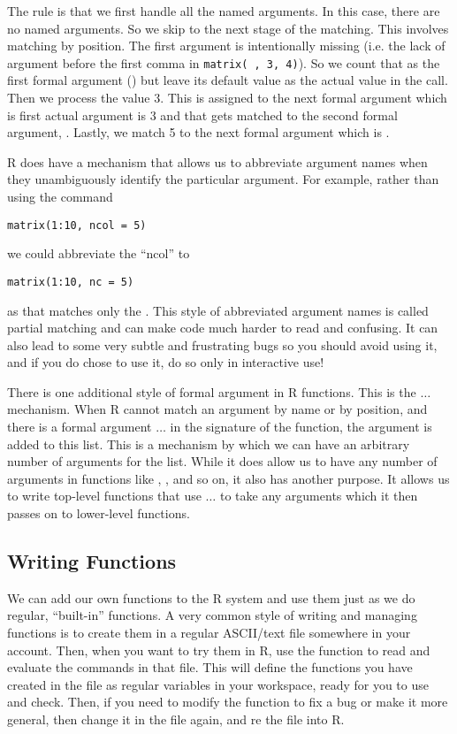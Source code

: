 {The rule is that we first handle all the named arguments. In this
case, there are no named arguments. So we skip to the next stage of
the matching. This involves matching by position. The first argument
is intentionally missing (i.e. the lack of argument before the first
comma in \verb|matrix( , 3, 4)|). So we count that as the first formal
argument () but leave its default value as the actual value
in the call. Then we process the value 3. This is assigned to the next
formal argument which is first actual argument is 3 and that gets
matched to the second formal argument, . Lastly, we match 5
to the next formal argument which is .

R does have a mechanism that allows us to abbreviate argument names
when they unambiguously identify the particular argument. For example,
rather than using the command 
\begin{verbatim}
matrix(1:10, ncol = 5)
\end{verbatim}
we could
abbreviate the ``ncol'' to 
\begin{verbatim}
matrix(1:10, nc = 5)
\end{verbatim}
as that matches only the . This style of abbreviated
argument names is called partial matching and can make code much
harder to read and confusing. It can also lead to some very subtle and
frustrating bugs so you should avoid using it, and if you do chose to
use it, do so only in interactive use!

There is one additional style of formal argument in R functions. This
is the $\ldots$ mechanism. When R cannot match an argument by name or
by position, and there is a formal argument $\ldots$ in the signature
of the function, the argument is added to this list. This is a
mechanism by which we can have an arbitrary number of arguments for
the list. While it does allow us to have any number of arguments in
functions like , ,  and so
on, it also has another purpose. It allows us to write top-level
functions that use $\ldots$ to take any arguments which it then passes
on to lower-level functions.

\subsection{Writing Functions}
We can add our own functions to the R system and use them just as we
do regular, ``built-in'' functions. A very common style of writing and
managing functions is to create them in a regular ASCII/text file
somewhere in your account. Then, when you want to try them in R, use
the function  to read and evaluate the commands in
that file. This will define the functions you have created in the
file as regular variables in your workspace, ready for you to use and
check. Then, if you need to modify the function to fix a bug or make
it more general, then change it in the file again, and
re the file into R.

}
